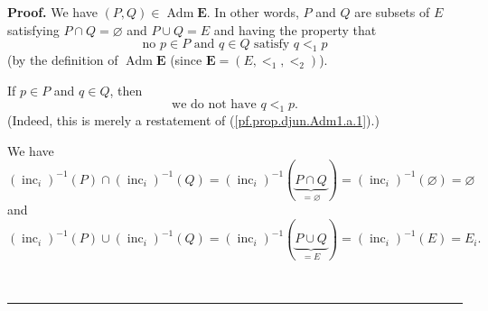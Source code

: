 \documentclass[numbers=enddot,12pt,final,onecolumn,notitlepage,abstracton]{scrartcl}
\theoremstyle{definition}
\newenvironment{proof}[1][Proof]{\noindent\textbf{#1.} }{\ \rule{0.5em}{0.5em}}
\newenvironment{verlong}{}{}
\begin{document}
\begin{verlong}
\begin{footnotesize}
\begin{proof}
We have $\left(  P,Q\right)  \in\operatorname*{Adm}\mathbf{E}$. In other
words, $P$ and $Q$ are subsets of $E$ satisfying $P\cap Q=\varnothing$ and
$P\cup Q=E$ and having the property that
\begin{equation}
\text{no }p\in P\text{ and }q\in Q\text{ satisfy }q<_{1}p
\label{pf.prop.djun.Adm1.a.1}%
\end{equation}
(by the definition of $\operatorname*{Adm}\mathbf{E}$ (since $\mathbf{E}%
=\left(  E,<_{1},<_{2}\right)  $).

If $p\in P$ and $q\in Q$, then%
\begin{equation}
\text{we do not have }q<_{1}p. \label{pf.prop.djun.Adm1.a.1a}%
\end{equation}
(Indeed, this is merely a restatement of (\ref{pf.prop.djun.Adm1.a.1}).)

We have
\[
\left(  \operatorname*{inc}\nolimits_{i}\right)  ^{-1}\left(  P\right)
\cap\left(  \operatorname*{inc}\nolimits_{i}\right)  ^{-1}\left(  Q\right)
=\left(  \operatorname*{inc}\nolimits_{i}\right)  ^{-1}\left(
\underbrace{P\cap Q}_{=\varnothing}\right)  =\left(  \operatorname*{inc}%
\nolimits_{i}\right)  ^{-1}\left(  \varnothing\right)  =\varnothing
\]
and%
\[
\left(  \operatorname*{inc}\nolimits_{i}\right)  ^{-1}\left(  P\right)
\cup\left(  \operatorname*{inc}\nolimits_{i}\right)  ^{-1}\left(  Q\right)
=\left(  \operatorname*{inc}\nolimits_{i}\right)  ^{-1}\left(
\underbrace{P\cup Q}_{=E}\right)  =\left(  \operatorname*{inc}\nolimits_{i}%
\right)  ^{-1}\left(  E\right)  =E_{i}.
\]



\end{proof}
\end{footnotesize}
\end{verlong}
\end{document}
